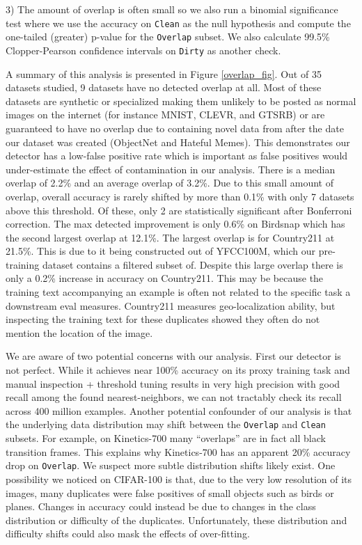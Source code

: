 3) The amount of overlap is often small so we also run a binomial significance test where we use the accuracy on \texttt{Clean} as the null hypothesis and compute the one-tailed (greater) p-value for the \texttt{Overlap} subset. We also calculate 99.5\% Clopper-Pearson confidence intervals on \texttt{Dirty} as another check.

A summary of this analysis is presented in Figure \ref{overlap_fig}. Out of 35 datasets studied, 9 datasets have no detected overlap at all. Most of these datasets are synthetic or specialized making them unlikely to be posted as normal images on the internet (for instance MNIST, CLEVR, and GTSRB) or are guaranteed to have no overlap due to containing novel data from after the date our dataset was created (ObjectNet and Hateful Memes). This demonstrates our detector has a low-false positive rate which is important as false positives would under-estimate the effect of contamination in our analysis. There is a median overlap of 2.2\% and an average overlap of 3.2\%. Due to this small amount of overlap, overall accuracy is rarely shifted by more than 0.1\% with only 7 datasets above this threshold. Of these, only 2 are statistically significant after Bonferroni correction. The max detected improvement is only 0.6\% on Birdsnap which has the second largest overlap at 12.1\%. The largest overlap is for Country211 at 21.5\%. This is due to it being constructed out of YFCC100M, which our pre-training dataset contains a filtered subset of. Despite this large overlap there is only a 0.2\% increase in accuracy on Country211. This may be because the training text accompanying an example is often not related to the specific task a downstream eval measures. Country211 measures geo-localization ability, but inspecting the training text for these duplicates showed they often do not mention the location of the image.

We are aware of two potential concerns with our analysis. First our detector is not perfect. While it achieves near 100\% accuracy on its proxy training task and manual inspection + threshold tuning results in very high precision with good recall among the found nearest-neighbors, we can not tractably check its recall across 400 million examples. Another potential confounder of our analysis is that the underlying data distribution may shift between the \texttt{Overlap} and \texttt{Clean} subsets. For example, on Kinetics-700 many ``overlaps'' are in fact all black transition frames. This explains why Kinetics-700 has an apparent 20\% accuracy drop on \texttt{Overlap}. We suspect more subtle distribution shifts likely exist. One possibility we noticed on CIFAR-100 is that, due to the very low resolution of its images, many duplicates were false positives of small objects such as birds or planes. Changes in accuracy could instead be due to changes in the class distribution or difficulty of the duplicates. Unfortunately, these distribution and difficulty shifts could also mask the effects of over-fitting.

